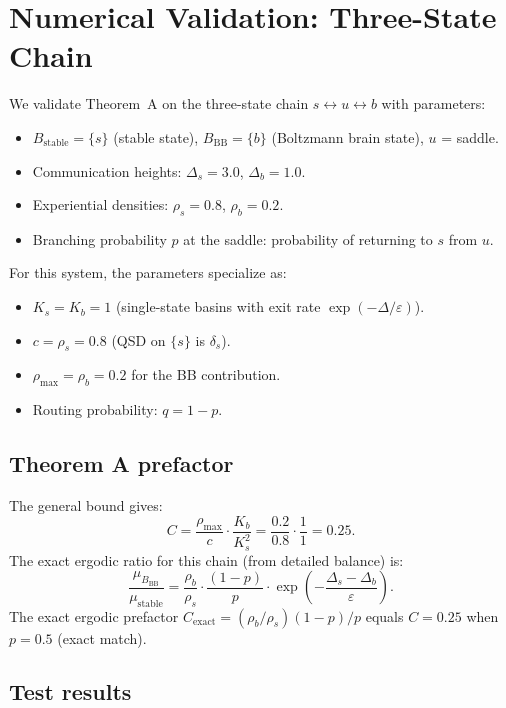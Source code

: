 \documentclass[11pt]{article}
\newcommand{\eps}{\varepsilon}
\newcommand{\Ds}{\Delta_s}
\newcommand{\Db}{\Delta_b}
\newcommand{\Bstable}{B_{\mathrm{stable}}}
\newcommand{\BBB}{B_{\mathrm{BB}}}
\newcommand{\muBB}{\mu_{\BBB}}
\begin{document}
\section{Numerical Validation: Three-State Chain}
\label{sec:validation}

We validate Theorem~A on the three-state chain
$s \leftrightarrow u \leftrightarrow b$ with parameters:
\begin{itemize}
\item $\Bstable = \{s\}$ (stable state), $\BBB = \{b\}$
  (Boltzmann brain state), $u$ = saddle.
\item Communication heights: $\Ds = 3.0$, $\Db = 1.0$.
\item Experiential densities: $\rho_s = 0.8$, $\rho_b = 0.2$.
\item Branching probability $p$ at the saddle: probability of
  returning to $s$ from $u$.
\end{itemize}

For this system, the parameters specialize as:
\begin{itemize}
\item $K_s = K_b = 1$ (single-state basins with exit rate
  $\exp(-\Delta/\eps)$).
\item $c = \rho_s = 0.8$ (QSD on $\{s\}$ is $\delta_s$).
\item $\rho_{\max} = \rho_b = 0.2$ for the BB contribution.
\item Routing probability: $q = 1-p$.
\end{itemize}

\subsection{Theorem A prefactor}

The general bound gives:
\[
  C = \frac{\rho_{\max}}{c} \cdot \frac{K_b}{K_s^2}
  = \frac{0.2}{0.8} \cdot \frac{1}{1} = 0.25.
\]
The exact ergodic ratio for this chain (from detailed balance) is:
\[
  \frac{\muBB}{\mu_{\mathrm{stable}}}
  = \frac{\rho_b}{\rho_s} \cdot \frac{(1-p)}{p}
    \cdot \exp\!\left(-\frac{\Ds - \Db}{\eps}\right).
\]
The exact ergodic prefactor
$C_{\mathrm{exact}} = (\rho_b/\rho_s)(1-p)/p$ equals $C = 0.25$
when $p = 0.5$ (exact match).

\subsection{Test results}
\end{document}
